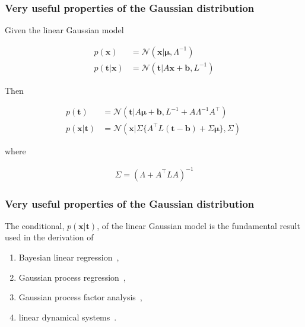 \documentclass[11pt]{beamer}
\begin{document}
\begin{frame}
    \frametitle{Very useful properties of the Gaussian distribution \citep{bishop06}}

	\small
	\begin{theorem}

		Given the linear Gaussian model

		\begin{align*}
			p(\mathbf{x})&=\mathcal{N}(\mathbf{x}|\boldsymbol{\mu},\Lambda^{-1})\\
			p(\mathbf{t}|\mathbf{x})&=\mathcal{N}(\mathbf{t}|A\mathbf{x}+\mathbf{b},L^{-1})
		\end{align*}

		Then

		\begin{align}
            p(\mathbf{t})&=\mathcal{N}(\mathbf{t}|A\boldsymbol{\mu}+\mathbf{b},L^{-1}+A\Lambda^{-1}A^\intercal)\label{eq:marginalLinearGaussianModel}\\
			p(\mathbf{x}|\mathbf{t})&=\mathcal{N}(\mathbf{x}|\Sigma\{A^\intercal L(\mathbf{t}-\mathbf{b})+\Sigma\boldsymbol{\mu}\},\Sigma)~\label{eq:conditionalLinearGaussianModel}
		\end{align}

		where

		\begin{align*}
			\Sigma=(\Lambda+A^\intercal LA)^{-1}
		\end{align*}

	\end{theorem}
	\normalsize
\end{frame}

\begin{frame}
    \frametitle{Very useful properties of the Gaussian distribution \citep{bishop06}}

	The conditional, $p(\mathbf{x}|\mathbf{t})$, of the linear Gaussian model is the fundamental result used in the derivation of

	\begin{enumerate}

		\item Bayesian linear regression~\citep{bishop06},

		\item Gaussian process regression~\citep{williamsAndRasmussen06},

		\item Gaussian process factor analysis~\citep{yuEtAl09},

		\item linear dynamical systems~\citep{durbinAndKoopman12}.

	\end{enumerate}

\end{frame}
\end{document}
